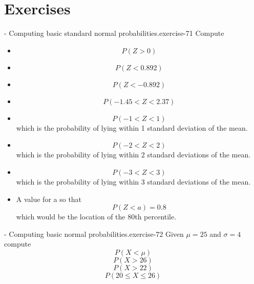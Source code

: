 \documentclass[10pt,]{book}
\numberwithin{equation}{section}
\newcommand{\lt}{<}
\newcommand{\gt}{>}
\begin{document}
\section[{Exercises}]{Exercises}\label{section-64}
\begin{inlineexercise}{- Computing basic standard normal probabilities.}{exercise-71}%
\hypertarget{p-1090}{}%
Compute \leavevmode%
\begin{itemize}[label=\textbullet]
\item{}%
\begin{equation*}
P( Z \gt 0)
\end{equation*}
%
\item{}%
\begin{equation*}
P( Z \lt 0.892)
\end{equation*}
%
\item{}%
\begin{equation*}
P( Z \lt -0.892)
\end{equation*}
%
\item{}%
\begin{equation*}
P( -1.45 \lt Z \lt 2.37)
\end{equation*}
%
\item{}%
\begin{equation*}
P( -1 \lt Z \lt 1)
\end{equation*}
which is the probability of lying within 1 standard deviation of the mean.%
\item{}%
\begin{equation*}
P( -2 \lt Z \lt 2)
\end{equation*}
which is the probability of lying within 2 standard deviations of the mean.%
\item{}%
\begin{equation*}
P( -3 \lt Z \lt 3)
\end{equation*}
which is the probability of lying within 3 standard deviations of the mean.%
\item{}A value for a so that%
\begin{equation*}
P( Z \lt a) = 0.8
\end{equation*}
which would be the location of the 80th percentile.%
\end{itemize}
%
\end{inlineexercise}
\begin{inlineexercise}{- Computing basic normal probabilities.}{exercise-72}%
\hypertarget{p-1091}{}%
Given \(\mu = 25\) and \(\sigma = 4\) compute%
\begin{equation*}
P(X \lt \mu)
\end{equation*}
%
\begin{equation*}
P( X \gt 26)
\end{equation*}
%
\begin{equation*}
P( X \gt 22)
\end{equation*}
%
\begin{equation*}
P( 20 \le X \le 26)
\end{equation*}
%
\end{inlineexercise}
\end{document}
